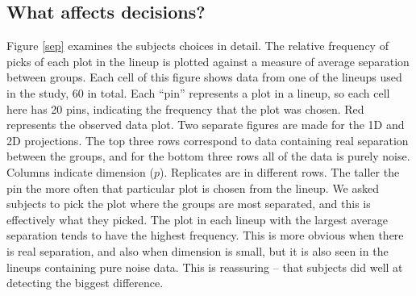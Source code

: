 \subsection{What affects decisions?}

\normalsize

Figure \ref{sep} examines the subjects choices in detail. The relative frequency of picks of each plot in the lineup is plotted against a measure of average separation between groups. Each cell of this figure shows data from one of the lineups used in the study, 60 in total. Each ``pin'' represents a plot in a lineup, so each cell here has 20 pins, indicating the frequency that the plot was chosen. Red represents the observed data plot. Two separate figures are made for the 1D and 2D projections. The top three rows correspond to data containing real separation between the groups, and for the bottom three rows all of the data is purely noise. Columns indicate dimension ($p$). Replicates are in different rows. The taller the pin the more often that particular plot is chosen from the lineup. We asked subjects to pick the plot where the groups are most separated, and this is effectively what they picked. The plot in each lineup with the largest average separation tends to have the highest frequency. This is more obvious when there is real separation, and also when dimension is small, but it is also seen in the lineups containing pure noise data. This is reassuring -- that subjects did well at detecting the biggest difference.  

